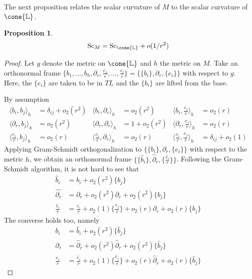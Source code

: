 \documentclass[12pt, reqno]{amsart}
\theoremstyle{plain} %
\newtheorem{proposition}[theorem]{Proposition}
\theoremstyle{definition}
\theoremstyle{remark}
\numberwithin{equation}{section}
\newcommand{\dom}[1]{\hat{#1}}
\newcommand{\bund}[1]{\mathbb{#1}}
\newcommand{\Sc}{\mathrm{Sc}}
\newcommand{\inner}[1]{\langle #1 \rangle}
\newcommand{\hdim}{h} %
\newcommand{\ldim}{l} %
\begin{document}
The next proposition relates the scalar curvature of \(M\) to the scalar curvature of \(\cone{\bund{L}}\).
\begin{proposition}\label{prop:asymptotic scalar curvature estimate for family of cones}
    \begin{equation*}
        \Sc_M = \Sc_{\cone{\bund{L}}} + o(1/r^2)
    \end{equation*}
\end{proposition}
\begin{proof}
    Let \(g\) denote the metric on \(\cone{\bund{L}}\) and \(h\) the metric on \(M\).
    Take an orthonormal frame \(\{b_1, \ldots, b_{\hdim}, \partial_r, \frac{e_1}{r}, \ldots, \frac{e_{\ldim}}{r}\} = \{\{b_i\}, \partial_r, \{e_i\}\}\) with respect to \(g\).
    Here, the \(\{e_i\}\) are taken to be in \(TL\) and the \(\{b_i\}\) are lifted from the base.

    By assumption
    \begin{align*}
        \inner{b_i, b_j}_h &= \delta_{ij} + o_2(r^2) &\inner{b_i, \partial_r}_h &= o_2(r^2) & \inner{b_i, \frac{e_i}{r}}_h &= o_2(r) \\
        \inner{\partial_r, b_j}_h &= o_2(r^2) & \inner{\partial_r, \partial_r}_h &= 1 + o_2(r^2) & \inner{\partial_r, \frac{e_i}{r}}_h &= o_2(r) \\
        \inner{\frac{e_i}{r}, b_j}_h &= o_2(r) & \inner{\frac{e_i}{r}, \partial_r}_h &= o_2(r) & \inner{\frac{e_i}{r}, \frac{e_j}{r}}_h &= \delta_{ij} + o_2(1)
    \end{align*}
    Applying Gram-Schmidt orthogonalization to \(\{\{b_i\}, \partial_r, \{e_i\}\}\) with respect to the metric \(h\), we obtain an orthonormal frame \(\{\{\dom{b}_i\}, \dom{\partial}_r, \{\frac{\dom{e}_i}{r}\}\}\).
    Following the Gram-Schmidt algorithm, it is not hard to see that
    \begin{align}
        \label{eqn:new from original - base} \dom{b}_i &= b_i + o_2(r^2)\{b_j\} \\
        \label{eqn:new from original - radial} \dom{\partial_r} &= \partial_r + o_2(r^2) \partial_r + o_2(r^2)\{b_j\} \\
        \label{eqn:new from original - link} \frac{\dom{e}_i}{r} &= \frac{e_i}{r} + o_2(1) \{\frac{e_j}{r}\} + o_2(r) \partial_r + o_2(r) \{b_j\}
    \end{align}
    The converse holds too, namely
    \begin{align}
        \label{eqn:original from new - base} b_i &= \dom{b}_i + o_2(r^2)\{\dom{b}_j\} \\
        \label{eqn:original from new - radial}\partial_r &= \dom{\partial}_r + o_2(r^2) \dom{\partial}_r + o_2(r^2)\{\dom{b}_j\} \\
        \label{eqn:original from new - link} \frac{e_i}{r} &= \frac{\dom{e}_i}{r} + o_2(1) \{\frac{\dom{e}_j}{r}\} + o_2(r) \dom{\partial}_r + o_2(r) \{\dom{b}_j\}
    \end{align}


\end{proof}
\end{document}
